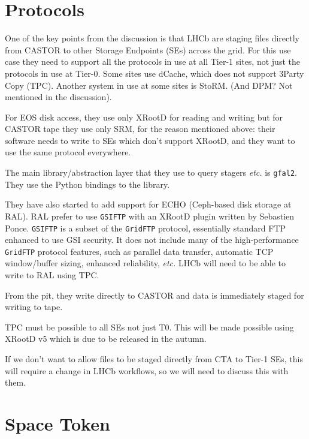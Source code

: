 \documentclass{lhcb+cta}
\begin{document}

\section*{Protocols}

One of the key points from the discussion is that LHCb are staging files directly from CASTOR to other Storage Endpoints (SEs) across the grid. For this use case they need to support all the protocols in use at all Tier-1 sites, not just the protocols in use at Tier-0. Some sites use dCache, which does not support 3\rd Party Copy (TPC). Another system in use at some sites is StoRM. (And DPM? Not mentioned in the discussion).

For EOS disk access, they use only XRootD for reading and writing but for CASTOR tape they use only SRM, for the reason mentioned above: their software needs to write to SEs which don't support XRootD, and they want to use the same protocol everywhere.

The main library/abstraction layer that they use to query stagers \textit{etc.} is \texttt{gfal2}. They use the Python bindings to the library.

They have also started to add support for ECHO (Ceph-based disk storage at RAL). RAL prefer to use \texttt{GSIFTP} with an XRootD plugin written by Sebastien Ponce. \texttt{GSIFTP} is a subset of the \texttt{GridFTP} protocol, essentially standard FTP enhanced to use GSI security. It does not include many of the high-performance \texttt{GridFTP} protocol features, such as parallel data transfer, automatic TCP window/buffer sizing, enhanced reliability, \textit{etc.} LHCb will need to be able to write to RAL using TPC.


From the pit, they write directly to CASTOR and data is immediately staged for writing to tape.

TPC must be possible to all SEs not just T0. This will be made possible using XRootD v5 which is due to be released in the autumn.

If we don't want to allow files to be staged directly from CTA to Tier-1 SEs, this will require a change in LHCb workflows, so we will need to discuss this with them.

\section*{Space Token}
\end{document}
